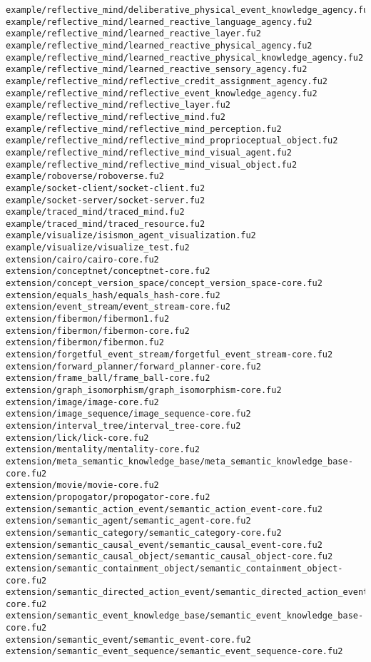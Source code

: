 \begin{lstlisting}
example/reflective_mind/deliberative_physical_event_knowledge_agency.fu2
example/reflective_mind/learned_reactive_language_agency.fu2
example/reflective_mind/learned_reactive_layer.fu2
example/reflective_mind/learned_reactive_physical_agency.fu2
example/reflective_mind/learned_reactive_physical_knowledge_agency.fu2
example/reflective_mind/learned_reactive_sensory_agency.fu2
example/reflective_mind/reflective_credit_assignment_agency.fu2
example/reflective_mind/reflective_event_knowledge_agency.fu2
example/reflective_mind/reflective_layer.fu2
example/reflective_mind/reflective_mind.fu2
example/reflective_mind/reflective_mind_perception.fu2
example/reflective_mind/reflective_mind_proprioceptual_object.fu2
example/reflective_mind/reflective_mind_visual_agent.fu2
example/reflective_mind/reflective_mind_visual_object.fu2
example/roboverse/roboverse.fu2
example/socket-client/socket-client.fu2
example/socket-server/socket-server.fu2
example/traced_mind/traced_mind.fu2
example/traced_mind/traced_resource.fu2
example/visualize/isismon_agent_visualization.fu2
example/visualize/visualize_test.fu2
extension/cairo/cairo-core.fu2
extension/conceptnet/conceptnet-core.fu2
extension/concept_version_space/concept_version_space-core.fu2
extension/equals_hash/equals_hash-core.fu2
extension/event_stream/event_stream-core.fu2
extension/fibermon/fibermon1.fu2
extension/fibermon/fibermon-core.fu2
extension/fibermon/fibermon.fu2
extension/forgetful_event_stream/forgetful_event_stream-core.fu2
extension/forward_planner/forward_planner-core.fu2
extension/frame_ball/frame_ball-core.fu2
extension/graph_isomorphism/graph_isomorphism-core.fu2
extension/image/image-core.fu2
extension/image_sequence/image_sequence-core.fu2
extension/interval_tree/interval_tree-core.fu2
extension/lick/lick-core.fu2
extension/mentality/mentality-core.fu2
extension/meta_semantic_knowledge_base/meta_semantic_knowledge_base-core.fu2
extension/movie/movie-core.fu2
extension/propogator/propogator-core.fu2
extension/semantic_action_event/semantic_action_event-core.fu2
extension/semantic_agent/semantic_agent-core.fu2
extension/semantic_category/semantic_category-core.fu2
extension/semantic_causal_event/semantic_causal_event-core.fu2
extension/semantic_causal_object/semantic_causal_object-core.fu2
extension/semantic_containment_object/semantic_containment_object-core.fu2
extension/semantic_directed_action_event/semantic_directed_action_event-core.fu2
extension/semantic_event_knowledge_base/semantic_event_knowledge_base-core.fu2
extension/semantic_event/semantic_event-core.fu2
extension/semantic_event_sequence/semantic_event_sequence-core.fu2

\end{lstlisting}
